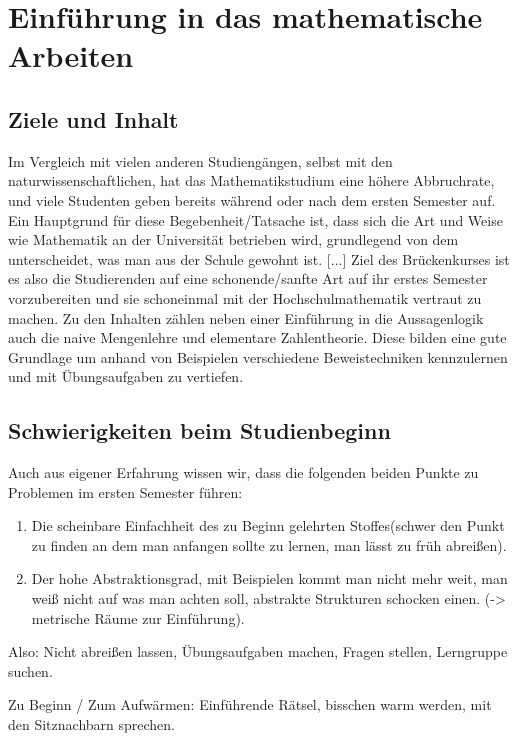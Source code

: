 \chapter{Einführung in das mathematische Arbeiten}
\section{Ziele und Inhalt}
Im Vergleich mit vielen anderen Studiengängen, selbst mit den naturwissenschaftlichen,
hat das Mathematikstudium eine höhere Abbruchrate, und viele Studenten geben bereits während
oder nach dem ersten Semester auf. Ein Hauptgrund für diese Begebenheit/Tatsache ist, dass
sich die Art und Weise wie Mathematik an der Universität betrieben wird, grundlegend von dem
unterscheidet, was man aus der Schule gewohnt ist. [...] Ziel des Brückenkurses ist es also die
Studierenden auf eine schonende/sanfte Art auf ihr erstes Semester vorzubereiten und sie schoneinmal
mit der Hochschulmathematik vertraut zu machen. Zu den Inhalten zählen neben einer Einführung
in die Aussagenlogik auch die naive Mengenlehre und elementare Zahlentheorie. Diese bilden
eine gute Grundlage um anhand von Beispielen verschiedene Beweistechniken kennzulernen und
mit Übungsaufgaben zu vertiefen.

\section{Schwierigkeiten beim Studienbeginn}
Auch aus eigener Erfahrung wissen wir, dass die folgenden beiden Punkte zu Problemen im ersten
Semester führen:
\begin{enumerate}
    \item
    Die scheinbare Einfachheit des zu Beginn gelehrten Stoffes(schwer den Punkt zu finden an
    dem man anfangen sollte zu lernen, man lässt zu früh abreißen).
    \item
    Der hohe Abstraktionsgrad, mit Beispielen kommt man nicht mehr weit, man weiß nicht auf
    was man achten soll, abstrakte Strukturen schocken einen. (-> metrische Räume zur Einführung).
\end{enumerate}
Also: Nicht abreißen lassen, Übungsaufgaben machen, Fragen stellen, Lerngruppe suchen.

Zu Beginn / Zum Aufwärmen: Einführende Rätsel, bisschen warm werden, mit den Sitznachbarn sprechen.
